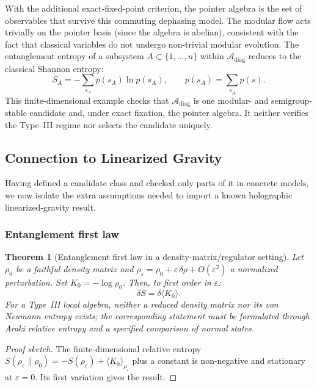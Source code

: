 \documentclass[12pt,a4paper,openany]{book}
\newtheorem{theorem}{Theorem}[chapter]
\begin{document}
With the additional exact-fixed-point criterion, the pointer algebra is the set of observables that survive this commuting dephasing model.
The modular flow acts trivially on the pointer basis (since the algebra is abelian), consistent with the fact that classical variables do not undergo non-trivial modular evolution.
The entanglement entropy of a subsystem $A \subset \{1, \ldots, n\}$ within $\mathcal{A}_{\mathrm{diag}}$ reduces to the classical Shannon entropy:
\begin{equation}
S_A = -\sum_{s_A} p(s_A) \ln p(s_A), \qquad p(s_A) = \sum_{s_{\bar{A}}} p(s).
\end{equation}
This finite-dimensional example checks that $\mathcal A_{\mathrm{diag}}$ is one modular- and semigroup-stable candidate and, under exact fixation, the pointer algebra.  It neither verifies the Type~III regime nor selects the candidate uniquely.


\subsection{Connection to Linearized Gravity}
\label{D-sec:linearized}

Having defined a candidate class and checked only parts of it in concrete models, we now isolate the extra assumptions needed to import a known holographic linearized-gravity result.

\subsubsection{Entanglement first law}

\begin{theorem}[Entanglement first law in a density-matrix/regulator setting]
\label{D-thm:first-law}
Let $\rho_0$ be a faithful density matrix and $\rho_\varepsilon=\rho_0+\varepsilon\,\delta\rho+O(\varepsilon^2)$ a normalized perturbation.  Set $K_0=-\log\rho_0$.
Then, to first order in $\varepsilon$:
\begin{equation}
\delta S = \delta \langle K_0 \rangle.
\end{equation}
For a Type~III local algebra, neither a reduced density matrix nor its von Neumann entropy exists; the corresponding statement must be formulated through Araki relative entropy and a specified comparison of normal states.
\end{theorem}

\begin{proof}[Proof sketch]
The finite-dimensional relative entropy $S(\rho_\varepsilon\|\rho_0)=-S(\rho_\varepsilon)+\langle K_0\rangle_{\rho_\varepsilon}$ plus a constant is non-negative and stationary at $\varepsilon=0$.  Its first variation gives the result.
\end{proof}
\end{document}
